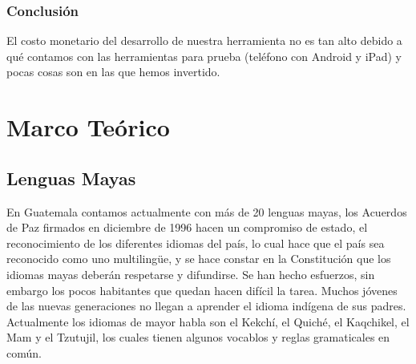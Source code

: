 \documentclass[a4paper,openright,11pt]{article}
\begin{document}
\begin{table}[h]
\caption{Factibilidad Econ\'omica}
\end{table}

\subsubsection{Conclusión}
El costo monetario del desarrollo de nuestra herramienta no es tan alto debido a qué contamos con las herramientas para prueba (teléfono con Android y iPad) y pocas cosas son en las que hemos invertido.
\newpage

\section{Marco Teórico}
\subsection{Lenguas Mayas}
En Guatemala contamos actualmente con más de 20 lenguas mayas,  los Acuerdos de Paz firmados en diciembre de 1996 hacen un compromiso de estado, el reconocimiento de los diferentes idiomas del país, lo cual hace que el país sea reconocido como uno multilingüe, y se hace constar en la Constitución que los idiomas mayas deberán respetarse y difundirse. Se han hecho esfuerzos, sin embargo los pocos habitantes que quedan hacen difícil la tarea. Muchos jóvenes de las nuevas generaciones no llegan a aprender el idioma indígena de sus padres. Actualmente los idiomas de mayor habla son el Kekchí, el Quiché, el Kaqchikel, el Mam y el Tzutujil, los cuales tienen algunos vocablos y reglas gramaticales en común. \\
 
\end{document}
